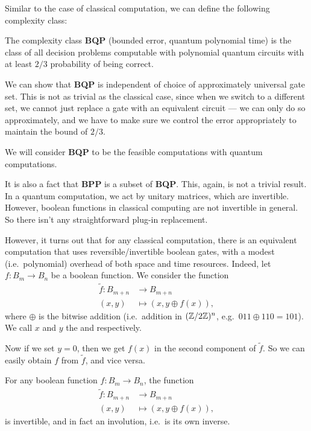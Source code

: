 Similar to the case of classical computation, we can define the following complexity class:
\begin{defi}
  The complexity class \textbf{BQP} (bounded error, quantum polynomial time) is the class of all decision problems computable with polynomial quantum circuits with at least $2/3$ probability of being correct.
\end{defi}
We can show that \textbf{BQP} is independent of choice of approximately universal gate set. This is not as trivial as the classical case, since when we switch to a different set, we cannot just replace a gate with an equivalent circuit --- we can only do so approximately, and we have to make sure we control the error appropriately to maintain the bound of $2/3$.

We will consider \textbf{BQP} to be the feasible computations with quantum computations.

It is also a fact that \textbf{BPP} is a subset of \textbf{BQP}. This, again, is not a trivial result. In a quantum computation, we act by unitary matrices, which are invertible. However, boolean functions in classical computing are not invertible in general. So there isn't any straightforward plug-in replacement.

However, it turns out that for any classical computation, there is an equivalent computation that uses reversible/invertible boolean gates, with a modest (i.e.\ polynomial) overhead of both space and time resources. Indeed, let $f: B_m \to B_n$ be a boolean function. We consider the function
\begin{align*}
  \tilde{f}: B_{m + n} &\to B_{m + n}\\
  (x, y) &\mapsto (x, y \oplus f(x)),
\end{align*}
where $\oplus$ is the bitwise addition (i.e.\ addition in $(\mathbb{Z}/2\mathbb{Z})^n$, e.g.\ $011 \oplus 110 = 101$). We call $x$ and $y$ the  and  respectively.

Now if we set $y = 0$, then we get $f(x)$ in the second component of $\tilde{f}$. So we can easily obtain $f$ from $\tilde{f}$, and vice versa.

\begin{lemma}
  For any boolean function $f: B_m \to B_n$, the function
  \begin{align*}
    \tilde{f}: B_{m + n} &\to B_{m + n}\\
    (x, y) &\mapsto (x, y \oplus f(x)),
  \end{align*}
  is invertible, and in fact an involution, i.e.\ is its own inverse.
\end{lemma}

